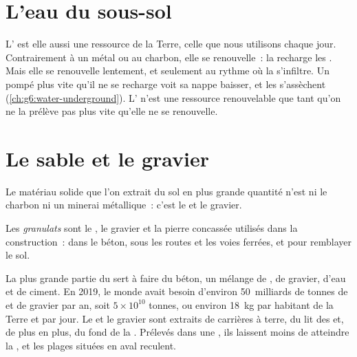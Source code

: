 \section{L'eau du sous-sol}

L' est elle aussi une ressource de la Terre, celle que nous
utilisons chaque jour. Contrairement à un métal ou au charbon, elle se
renouvelle~: la  recharge les . Mais elle se renouvelle
lentement, et seulement au rythme où la  s'infiltre. Un 
pompé plus vite qu'il ne se recharge voit sa nappe baisser, et les 
s'assèchent (\cref{ch:g6:water-underground}). L' n'est une
ressource renouvelable que tant qu'on ne la prélève pas plus vite qu'elle
ne se renouvelle.

\section{Le sable et le gravier}

Le matériau solide que l'on extrait du sol en plus grande quantité n'est
ni le charbon ni un minerai métallique~: c'est le  et le gravier.

\begin{definition}[Granulats]\label{def:g9:earth-resources:aggregate}
Les \emph{granulats} sont le , le gravier et la
pierre concassée utilisés dans la construction~: dans le béton, sous les
routes et les voies ferrées, et pour remblayer le sol.
\end{definition}

La plus grande partie du  sert à faire du béton, un mélange de ,
de gravier, d'eau et de ciment. En 2019, le monde avait besoin d'environ
50~milliards de tonnes de  et de gravier par an,
soit $5 \times 10^{10}$ tonnes, ou environ \qty{18}{kg} par habitant de la
Terre et par jour. Le  et le gravier sont extraits de carrières à
terre, du lit des  et, de plus en plus, du fond de la . Prélevés
dans une , ils laissent moins de  atteindre la , et les
plages situées en aval reculent.

